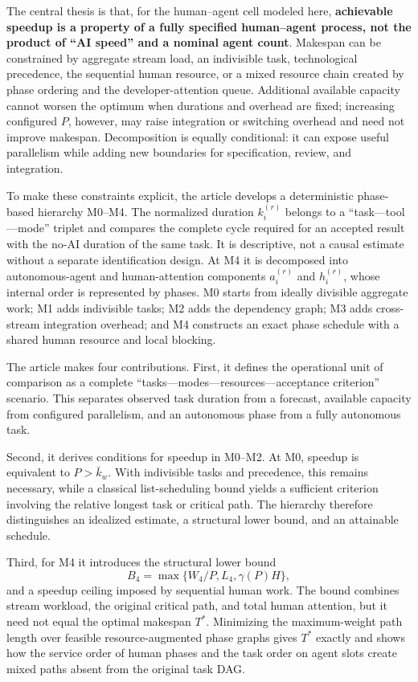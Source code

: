 The central thesis is that, for the human--agent cell modeled here,
\textbf{achievable speedup is a property of a fully specified human--agent
process, not the product of ``AI speed'' and a nominal agent count}. Makespan
can be constrained by aggregate stream load, an
indivisible task, technological precedence, the sequential human resource, or
a mixed resource chain created by phase ordering and the developer-attention
queue. Additional available capacity cannot worsen the optimum when durations
and overhead are fixed; increasing configured $P$, however, may raise
integration or switching overhead and need not improve makespan. Decomposition
is equally conditional: it can expose useful parallelism while adding new
boundaries for specification, review, and integration.

To make these constraints explicit, the article develops a deterministic
phase-based hierarchy M0--M4. The normalized duration $k_i^{(r)}$ belongs to a
``task---tool---mode'' triplet and compares the complete cycle required for an
accepted result with the no-AI duration of the same task. It is descriptive,
not a causal estimate without a separate identification design. At M4 it is
decomposed into autonomous-agent and human-attention components
$a_i^{(r)}$ and $h_i^{(r)}$, whose internal order is represented by phases. M0
starts from ideally divisible aggregate work; M1 adds indivisible tasks; M2
adds the dependency graph; M3 adds cross-stream integration overhead; and M4
constructs an exact phase schedule with a shared human resource and local
blocking.

The article makes four contributions. First, it defines the operational unit
of comparison as a complete ``tasks---modes---resources---acceptance
criterion'' scenario. This separates observed task duration from a forecast,
available capacity from configured parallelism, and an autonomous phase from a
fully autonomous task.

Second, it derives conditions for speedup in M0--M2. At M0, speedup is
equivalent to $P>\bar{k}_w$. With indivisible tasks and precedence, this remains
necessary, while a classical list-scheduling bound yields a sufficient
criterion involving the relative longest task or critical path. The hierarchy
therefore distinguishes an idealized estimate, a structural lower bound, and
an attainable schedule.

Third, for M4 it introduces the structural lower bound
\[
  B_4=\max\{W_4/P,L_4,\gamma(P)H\},
\]
and a speedup ceiling imposed by sequential human work. The bound combines
stream workload, the original critical path, and total human attention, but it
need not equal the optimal makespan $T^*$. Minimizing the maximum-weight path
length over feasible resource-augmented phase graphs gives $T^*$ exactly and
shows how the service order of human phases and the task order on agent slots
create mixed paths absent from the original task DAG.

